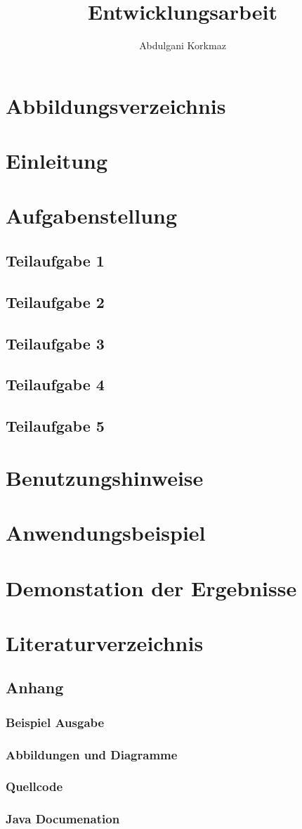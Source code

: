 \documentclass[11pt]{article}
\author{Abdulgani Korkmaz}
\title{Entwicklungsarbeit}
\begin{document}
\maketitle
\newpage
\section{Abbildungsverzeichnis}
\section{Einleitung}
\section{Aufgabenstellung}
    \subsection{Teilaufgabe 1}
    \subsection{Teilaufgabe 2}
    \subsection{Teilaufgabe 3}
    \subsection{Teilaufgabe 4}
    \subsection{Teilaufgabe 5}
\section{Benutzungshinweise}
\section{Anwendungsbeispiel}
\section{Demonstation der Ergebnisse}
\section{Literaturverzeichnis}
    \subsection{Anhang}
        \subsubsection{Beispiel Ausgabe}
        \subsubsection{Abbildungen und Diagramme}
        \subsubsection{Quellcode}
        \subsubsection{Java Documenation}
\end{document}
